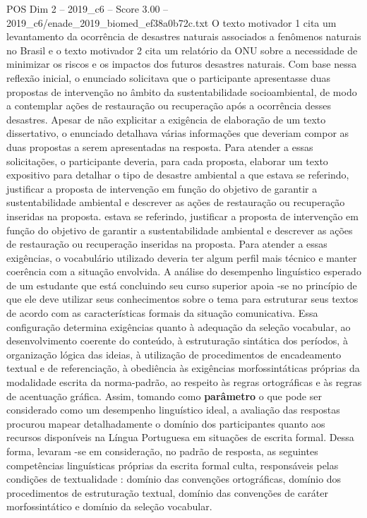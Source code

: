 \begin{textsample}{POS Dim 2 – 2019\_c6 – Score 3.00 – 2019\_c6/enade\_2019\_biomed\_ef38a0b72c.txt}
O texto motivador 1 cita um levantamento da ocorrência de desastres naturais associados a fenômenos naturais no Brasil e o texto motivador 2 cita um relatório da ONU sobre a necessidade de minimizar os riscos e os impactos dos futuros desastres naturais.
Com base nessa reflexão inicial, o enunciado solicitava que o participante apresentasse duas propostas de intervenção no âmbito da sustentabilidade socioambiental, de modo a contemplar ações de restauração ou recuperação após a ocorrência desses desastres.
Apesar de não explicitar a exigência de elaboração de um texto dissertativo, o enunciado detalhava várias informações que deveriam compor as duas propostas a serem apresentadas na resposta.
Para atender a essas solicitações, o participante deveria, para cada proposta, elaborar um texto expositivo para detalhar o tipo de desastre ambiental a que estava se referindo, justificar a proposta de intervenção em função do objetivo de garantir a sustentabilidade ambiental e descrever as ações de restauração ou recuperação inseridas na proposta. estava se referindo, justificar a proposta de intervenção em função do objetivo de garantir a sustentabilidade ambiental e descrever as ações de restauração ou recuperação inseridas na proposta.
Para atender a essas exigências, o vocabulário utilizado deveria ter algum perfil mais técnico e manter coerência com a situação envolvida.
A análise do desempenho linguístico esperado de um estudante que está concluindo seu curso superior apoia -se no princípio de que ele deve utilizar seus conhecimentos sobre o tema para estruturar seus textos de acordo com as características formais da situação comunicativa.
Essa configuração determina exigências quanto à adequação da seleção vocabular, ao desenvolvimento coerente do conteúdo, à estruturação sintática dos períodos, à organização lógica das ideias, à utilização de procedimentos de encadeamento textual e de referenciação, à obediência às exigências morfossintáticas próprias da modalidade escrita da norma-padrão, ao respeito às regras ortográficas e às regras de acentuação gráfica.
Assim, tomando como \textbf{parâmetro} o que pode ser considerado como um desempenho linguístico ideal, a avaliação das respostas procurou mapear detalhadamente o domínio dos participantes quanto aos recursos disponíveis na Língua Portuguesa em situações de escrita formal.
Dessa forma, levaram -se em consideração, no padrão de resposta, as seguintes competências linguísticas próprias da escrita formal culta, responsáveis pelas condições de textualidade : domínio das convenções ortográficas, domínio dos procedimentos de estruturação textual, domínio das convenções de caráter morfossintático e domínio da seleção vocabular.

\end{textsample}
